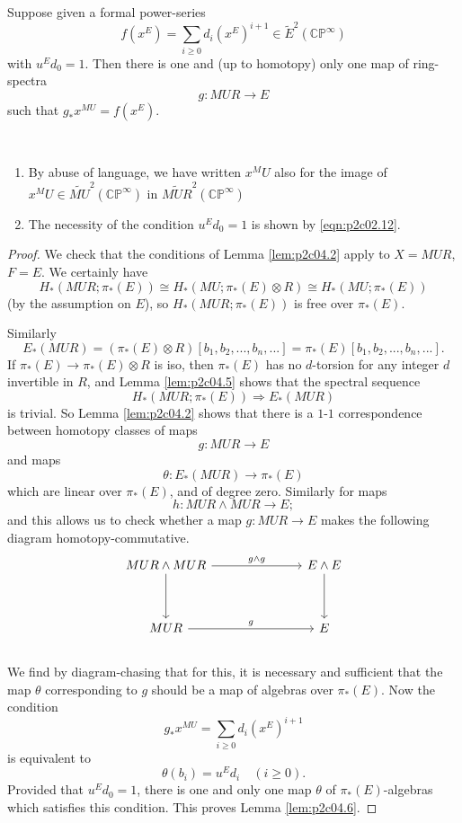 \documentclass[../main]{subfiles}
\begin{document}
\begin{lemma}
\label{lem:p2c04.6}
Suppose given a formal power-series
$$f(x^E)=\sum_{i\geq 0}d_i(x^E)^{i+1}\in\tilde{E}^2(\mathbb{CP}^\infty)$$
with $u^Ed_0=1$. Then there is one and (up to homotopy) only one map of ring-spectra
$$g:MUR\longrightarrow E$$
such that $g_\ast x^{MU}=f(x^E)$.
\end{lemma}
\begin{notes}
~
\begin{enumerate}
    \item By abuse of language, we have written $x^MU$ also for the image of $x^MU\in\widetilde{MU}^2(\mathbb{CP}^\infty)$ in $\widetilde{MUR}^2(\mathbb{CP}^\infty)$
    \item The necessity of the condition $u^Ed_0=1$ is shown by \ref{eqn:p2c02.12}.
\end{enumerate}
\end{notes}
\begin{proof}
We check that the conditions of Lemma \ref{lem:p2c04.2} apply to $X=MUR$, $F=E$. We certainly have
$$H_\ast(MUR;\pi_\ast(E))\cong H_\ast(MU;\pi_\ast(E)\otimes R)\cong H_\ast(MU;\pi_\ast(E))$$
(by the assumption on $E$), so $H_\ast(MUR;\pi_\ast(E))$ is free over $\pi_\ast(E)$. 

Similarly
$$E_\ast(MUR)=(\pi_\ast(E)\otimes R)[b_1,b_2,...,b_n,...]=\pi_\ast(E)[b_1,b_2,...,b_n,...].$$
If $\pi_\ast(E)\longrightarrow \pi_\ast(E)\otimes R$ is iso, then $\pi_\ast(E)$ has no $d$-torsion for any integer $d$ invertible in $R$, and Lemma \ref{lem:p2c04.5} shows that the spectral sequence
$$H_\ast(MUR;\pi_\ast(E))\Longrightarrow E_\ast(MUR)$$
is trivial. So Lemma \ref{lem:p2c04.2} shows that there is a $1$-$1$ correspondence between homotopy classes of maps
$$g:MUR\longrightarrow E$$
and maps
$$\theta:E_\ast(MUR)\longrightarrow \pi_\ast(E)$$
which are linear over $\pi_\ast(E)$, and of degree zero. Similarly for maps
$$h:MUR\wedge MUR \longrightarrow E;$$
and this allows us to check whether a map $g:MUR\longrightarrow E$ makes the following diagram homotopy-commutative.
~\\
$$\begin{tikzcd}
MUR\wedge MUR &&& E\wedge E \\
\\
MUR &&& E
\arrow["g\wedge g", from=1-1, to=1-4]
\arrow[from=1-1, to=3-1]
\arrow["g", from=3-1, to=3-4]
\arrow[from=1-4, to=3-4]
\end{tikzcd}$$
~\\
We find by diagram-chasing that for this, it is necessary and sufficient that the map $\theta$ corresponding to $g$ should be a map of algebras over $\pi_\ast(E)$. Now the condition
$$g_\ast x^{MU}=\sum_{i\geq 0} d_i(x^E)^{i+1}$$
is equivalent to
$$\theta(b_i)=u^Ed_i\quad (i\geq 0).$$
Provided that $u^Ed_0=1$, there is one and only one map $\theta$ of $\pi_\ast(E)$-algebras which satisfies this condition. This proves Lemma \ref{lem:p2c04.6}.
\end{proof}
\end{document}
